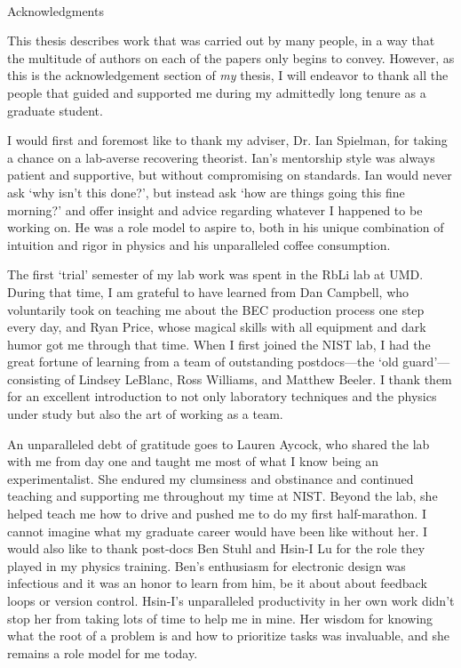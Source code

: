 
\renewcommand{\baselinestretch}{2}
\small\normalsize
\hbox{\ }
 
\vspace{-.65in}

\begin{center}
\large{Acknowledgments} 
\end{center} 

\vspace{1ex}

This thesis describes work that was carried out by many people, in a way that the multitude of authors on each of the papers only begins to convey. However, as this is the acknowledgement section of {\it my} thesis, I will endeavor to thank all the people that guided and supported me during my admittedly long tenure as a graduate student. 

I would first and foremost like to thank my adviser, Dr. Ian Spielman, for taking a chance on a lab-averse recovering theorist. Ian's mentorship style was always patient and supportive, but without compromising on standards. Ian would never ask \lq{why isn't this done?}\rq{}, but instead ask \lq{how are things going this fine morning?}\rq{} and offer insight and advice regarding whatever I happened to be working on. He was a role model to aspire to, both in his unique combination of intuition and rigor in physics and his unparalleled coffee consumption.

The first \lq{trial}\rq{} semester of my lab work was spent in the RbLi lab at UMD. During that time, I am grateful to have learned from Dan Campbell, who voluntarily took on teaching me about the BEC production process one step every day, and Ryan Price, whose magical skills with all equipment and dark humor got me through that time. When I first joined the NIST lab, I had the great fortune of learning from a team of outstanding postdocs---the \lq{old guard}\rq{}---consisting of Lindsey LeBlanc, Ross Williams, and Matthew Beeler. I thank them for an excellent introduction to not only laboratory techniques and the physics under study but also the art of working as a team. 

An unparalleled debt of gratitude goes to Lauren Aycock, who shared the lab with me from day one and taught me most of what I know being an experimentalist. She endured my clumsiness and obstinance and continued teaching and supporting me throughout my time at NIST. Beyond the lab, she helped teach me how to drive and pushed me to do my first half-marathon. I cannot imagine what my graduate career would have been like without her. I would also like to thank post-docs Ben Stuhl and Hsin-I Lu for the role they played in my physics training. Ben's enthusiasm for electronic design was infectious and it was an honor to learn from him, be it about about feedback loops or version control. Hsin-I's unparalleled productivity in her own work didn't stop her from taking lots of time to help me in mine. Her wisdom for knowing what the root of a problem is and how to prioritize tasks was invaluable, and she remains a role model for me today.

